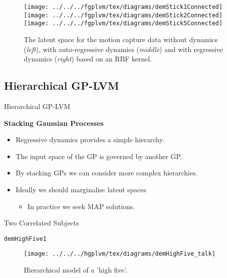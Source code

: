 \begin{flushright}
%
\begin{figure}
\begin{centering}
\texttt{[image: ../../../fgplvm/tex/diagrams/demStick1Connected]}\texttt{[image: ../../../fgplvm/tex/diagrams/demStick2Connected]}\texttt{[image: ../../../fgplvm/tex/diagrams/demStick5Connected]}
\par\end{centering}

\caption{The latent space for the motion capture data without dynamics (\emph{left}),
with auto-regressive dynamics (\emph{middle}) and with regressive
dynamics (\emph{right}) based on an RBF kernel. }

\end{figure}

\par\end{flushright}


\subsection{Hierarchical GP-LVM}

Hierarchical GP-LVM

\textbf{Stacking Gaussian Processes}
\begin{itemize}
\item Regressive dynamics provides a simple hierarchy.
\item The input space of the GP is governed by another GP.
\item By stacking GPs we can consider more complex hierarchies.
\item Ideally we should marginalise latent spaces

\begin{itemize}
\item In practice we seek MAP solutions.
\end{itemize}
\end{itemize}
Two Correlated Subjects

\texttt{demHighFive1}

%
\begin{figure}
\begin{centering}
\texttt{[image: ../../../hgplvm/tex/diagrams/demHighFive\_talk]}
\par\end{centering}

\caption{Hierarchical model of a 'high five'.}

\end{figure}


